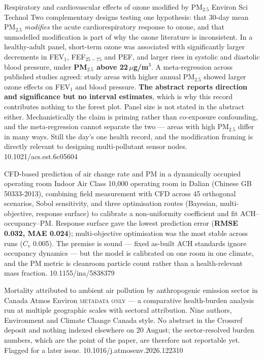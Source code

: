\documentclass[10pt]{article}
\begin{document}
\clearpage


{Respiratory and cardiovascular effects of ozone modified by PM$_{2.5}$}
{Environ Sci Technol}
{Two complementary designs testing one hypothesis: that 30-day mean PM$_{2.5}$
\emph{modifies} the acute cardiorespiratory response to ozone, and that unmodelled
modification is part of why the ozone literature is inconsistent. In a healthy-adult
panel, short-term ozone was associated with significantly larger decrements in FEV$_1$,
FEF$_{25-75}$ and PEF, and larger rises in systolic and diastolic blood pressure, under
\textbf{PM$_{2.5}$ above 22\,$\mu$g/m$^3$}. A meta-regression across published studies
agreed: study areas with higher annual PM$_{2.5}$ showed larger ozone effects on FEV$_1$
and blood pressure. \textbf{The abstract reports direction and significance but no
interval estimates}, which is why this record contributes nothing to the forest plot.
Panel size is not stated in the abstract either. Mechanistically the claim is priming
rather than co-exposure confounding, and the meta-regression cannot separate the two ---
areas with high PM$_{2.5}$ differ in many ways. Still the day's one health record, and
the modification framing is directly relevant to designing multi-pollutant sensor nodes.}
{10.1021/acs.est.6c05604}


{CFD-based prediction of air change rate and PM in a dynamically occupied operating room}
{Indoor Air}
{Class 10{,}000 operating room in Dalian (Chinese GB 50333-2013), combining field
measurement with CFD across 45 orthogonal scenarios, Sobol sensitivity, and three
optimisation routes (Bayesian, multi-objective, response surface) to calibrate a
non-uniformity coefficient and fit ACH--occupancy--PM. Response surface gave the lowest
prediction error (\textbf{RMSE 0.032, MAE 0.024}); multi-objective optimisation was the
most stable across runs ($C_v$ 0.005). The premise is sound --- fixed as-built ACH
standards ignore occupancy dynamics --- but the model is calibrated on one room in one
climate, and the PM metric is cleanroom particle count rather than a health-relevant
mass fraction.}
{10.1155/ina/5838379}


{Mortality attributed to ambient air pollution by anthropogenic emission sector in Canada}
{Atmos Environ}
{\textsc{metadata only} --- a comparative health-burden analysis run at multiple
geographic scales with sectoral attribution. Nine authors, Environment and Climate Change
Canada style. No abstract in the Crossref deposit and nothing indexed elsewhere on
20 August; the sector-resolved burden numbers, which are the point of the paper, are
therefore not reportable yet. Flagged for a later issue.}
{10.1016/j.atmosenv.2026.122310}
\end{document}
